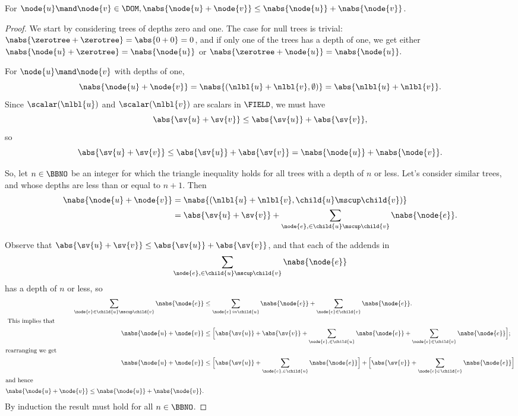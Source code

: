 \begin{proposition}\label{triangle1}
  For $\node{u} \mand \node{v} \in \DOM, \nabs{\node{u} + \node{v}}
  \leq \nabs{\node{u}} + \nabs{\node{v}}$.

  \begin{proof}
    We start by considering trees of depths zero and one. The case for null trees is trivial: $\nabs{\zerotree +
      \zerotree} = \abs{0 + 0} = 0$, and if only one of the trees has a depth of one, we get either $\nabs{\node{u} +
      \zerotree} = \nabs{\node{u}}$ or $\nabs{\zerotree + \node{u}} = \nabs{\node{u}}.$

    For $\node{u} \mand \node{v}$  with depths of one, \[\nabs{\node{u} + \node{v}} = \nabs{(\nlbl{u}+\nlbl{v}, \emptyset)}= \abs{\nlbl{u}+\nlbl{v}}.\]
    Since $\scalar(\nlbl{u})$ and $\scalar(\nlbl{v})$ are scalars in $\FIELD$, we must have
    \[\abs{\sv{u} + \sv{v}} \leq \abs{\sv{u}}+\abs{\sv{v}},\]
    so \[\abs{\sv{u}+\sv{v}} \leq \abs{\sv{u}}+\abs{\sv{v}} = \nabs{\node{u}} + \nabs{\node{v}}.\]

    So, let $n\in\BBNO$ be an integer for which the triangle inequality holds for all
    trees with a depth of $n$ or less.  Let's consider similar trees,  and  whose depths are less
    than or equal to $n+1$. Then
    \begin{align*}
      \nabs{\node{u} + \node{v}} &= \nabs{(\nlbl{u} + \nlbl{v}, \child{u}\mscup\child{v})} \\
      &= \abs{\sv{u} + \sv{v}} + \sum_{\node{e},\in{\child{u}\mscup\child{v}}}\nabs{\node{e}}.
    \end{align*}

    Observe that $\abs{\sv{u} + \sv{v}} \leq \abs{\sv{u}} + \abs{\sv{v}}$, and that each 
    of the addends in \[\sum_{\node{e},\in{\child{u}\mscup\child{v}}}\nabs{\node{e}}\] has a depth of $n$ or
    less, so 
    \begin{align*}
      \sum_{\node{e}\in{\child{u}\mscup\child{v}}}\nabs{\node{e}} &\leq \sum_{\node{e}\,in{\child{u}}}\nabs{\node{e}} + \sum_{\node{e}\in\child{v}}\nabs{\node{e}}.\\
      \intertext{ This implies that}
      \nabs{\node{u} + \node{v}} &\leq \Bigl[\abs{\sv{u}} + \abs{\sv{v}} + \sum_{\node{e},\in\child{u}}\nabs{\node{e}} + \sum_{\node{e}\in\child{v}}\nabs{\node{e}}\Bigr];\\
      \intertext{rearranging we get}
      \nabs{\node{u} + \node{v}}  &\leq \Bigl[\abs{\sv{u}} + \sum_{\node{e},\in\child{u}}\nabs{\node{e}}\Bigr] + \Bigl[\abs{\sv{v}} + \sum_{\node{e}\in\child{v}}\nabs{\node{e}}\Bigr] \\
      \intertext{and hence}
      \nabs{\node{u} + \node{v}} \leq \nabs{\node{u}} + \nabs{\node{v}}.
    \end{align*}
    By induction the result must hold for all $n\in\BBNO$.
  \end{proof}
\end{proposition}

